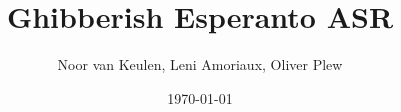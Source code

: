 \author{Noor van Keulen, Leni Amoriaux, Oliver Plew}
\subject{Speech Recognition (ELEC E5510), 2026}
\title{Ghibberish Esperanto ASR}
\date{\today}

\makeatletter
\newcommand {\Schlagworte}           {}
\newcommand {\TypDerArbeit}          {Project report}
\newcommand {\Course}                {Speech Recognition}
\newcommand {\Fakultaet}             {School of Electrical Engineering}
\newcommand {\Fachgebiet}            {Department of lnformation and Communications Engineering}
\newcommand {\Professor}             {Prof. Dr. Mikko Kurimo}
\newcommand {\Betreuer}              {M.Sc. Yaroslav Getman}
\newcommand {\NameDesAutors}         {\@author}
\newcommand {\eingereichtAm}         {\@date}
\makeatother
